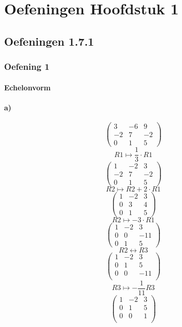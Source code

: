 \documentclass[lineaire_algebra_oplossingen.tex]{subfiles}
\begin{document}
\chapter{Oefeningen Hoofdstuk 1}

\section{Oefeningen 1.7.1}
\subsection{Oefening 1}
\subsubsection*{Echelonvorm}
\subsubsection*{a)}
$$\begin{pmatrix}
3 & -6 & 9\\
-2 & 7 & -2\\
0 & 1 & 5
\end{pmatrix}
$$
$$ R1 \longmapsto \frac{1}{3}\cdot R1$$
$$\begin{pmatrix}
1 & -2 & 3\\
-2 & 7 & -2\\
0 & 1 & 5
\end{pmatrix}
$$
$$R2 \longmapsto R2 + 2\cdot R1$$
$$\begin{pmatrix}
1 & -2 & 3\\
0 & 3 & 4\\
0 & 1 & 5
\end{pmatrix}
$$
$$
R2 \longmapsto - 3\cdot R1
$$
$$\begin{pmatrix}
1 & -2 & 3\\
0 & 0 & -11\\
0 & 1 & 5
\end{pmatrix}
$$
$$R2 \leftrightarrow R3$$
$$\begin{pmatrix}
1 & -2 & 3\\
0 & 1 & 5\\
0 & 0 & -11\\
\end{pmatrix}
$$
$$R3 \longmapsto -\frac{1}{11} R3$$
$$\begin{pmatrix}
1 & -2 & 3\\
0 & 1 & 5\\
0 & 0 & 1\\
\end{pmatrix}
$$
\end{document}
